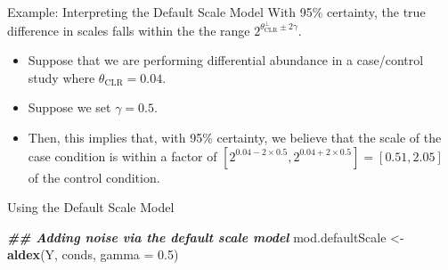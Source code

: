 \documentclass[
  ignorenonframetext,
]{beamer}
\newenvironment{Shaded}{\begin{snugshade}}{\end{snugshade}}
\newcommand{\AttributeTok}[1]{\textcolor[rgb]{0.13,0.29,0.53}{#1}}
\newcommand{\DocumentationTok}[1]{\textcolor[rgb]{0.56,0.35,0.01}{\textbf{\textit{#1}}}}
\newcommand{\FloatTok}[1]{\textcolor[rgb]{0.00,0.00,0.81}{#1}}
\newcommand{\FunctionTok}[1]{\textcolor[rgb]{0.13,0.29,0.53}{\textbf{#1}}}
\newcommand{\NormalTok}[1]{#1}
\newcommand{\OtherTok}[1]{\textcolor[rgb]{0.56,0.35,0.01}{#1}}
\providecommand{\tightlist}{%
  \setlength{\itemsep}{0pt}\setlength{\parskip}{0pt}}
\begin{document}
\begin{frame}{Example: Interpreting the Default Scale Model}
\protect\hypertarget{example-interpreting-the-default-scale-model}{}
With 95\% certainty, the true difference in scales falls within the the
range \(2^{\theta_{\text{CLR}}^\perp \pm 2 \gamma}\).

\pause

\begin{itemize}
\tightlist
\item
  Suppose that we are performing differential abundance in a
  case/control study where \(\theta_{\text{CLR}} = 0.04\).
\end{itemize}

\pause

\begin{itemize}
\tightlist
\item
  Suppose we set \(\gamma = 0.5\).
\end{itemize}

\pause

\begin{itemize}
\tightlist
\item
  Then, this implies that, with 95\% certainty, we believe that the
  scale of the case condition is within a factor of
  \([2^{0.04 - 2 \times 0.5}, 2^{0.04+ 2 \times 0.5}] = [0.51,2.05]\) of
  the control condition.
\end{itemize}
\end{frame}

\begin{frame}[fragile]{Using the Default Scale Model}
\protect\hypertarget{using-the-default-scale-model}{}
\begin{Shaded}
\begin{Highlighting}[]
\DocumentationTok{\#\# Adding noise via the default scale model}
\NormalTok{mod.defaultScale }\OtherTok{\textless{}{-}} \FunctionTok{aldex}\NormalTok{(Y, conds, }\AttributeTok{gamma =} \FloatTok{0.5}\NormalTok{)}
\end{Highlighting}
\end{Shaded}
\end{frame}
\end{document}
